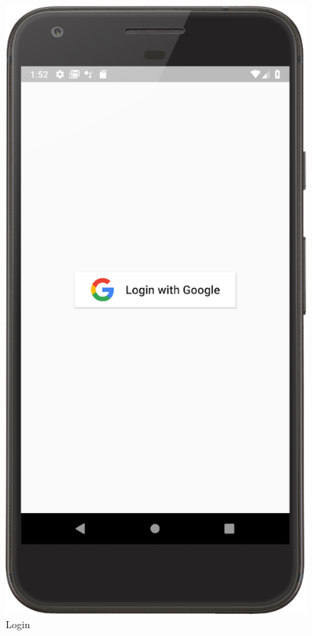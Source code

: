 \begin{figure}[!htb]
    \begin{minipage}[b]{0.3\textwidth}
        \includegraphics[scale=1]{images/login-page.png}
        \caption{Login}
        \label{ref:loginpage}

\end{minipage}
\end{figure}
